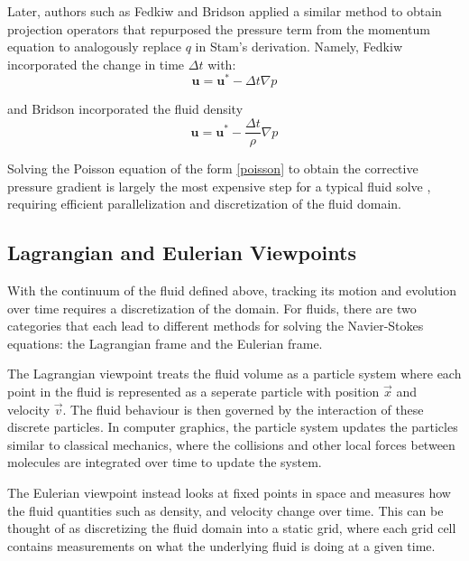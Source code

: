 \documentclass[a4paper, 11pt, titlepage]{article}
\begin{document}
Later, authors such as Fedkiw \cite{fedkiw2001visual} and Bridson \cite{bridsonbook} applied a
similar method to obtain projection operators that repurposed the pressure term
from the momentum equation to analogously replace $q$ in Stam's derivation. Namely, Fedkiw
incorporated the change in time $\Delta t$ with:
$$
    \bm{u} = \bm{u}^* - \Delta t \nabla p
$$

and Bridson incorporated the fluid density
$$
    \bm{u} = \bm{u}^* - \frac{\Delta t}{\rho} \nabla p
$$

Solving the Poisson equation of the form
\eqref{poisson} to obtain the corrective pressure gradient is largely the most
expensive step for a typical fluid solve \cite{bridsonbook}, requiring efficient
parallelization and discretization of the fluid domain.

\subsection{Lagrangian and Eulerian Viewpoints}
With the continuum of the fluid defined above, tracking its motion and evolution
over time requires a discretization of the domain. For fluids, there are two
categories that  each lead to different methods for solving
the Navier-Stokes equations: the Lagrangian frame and the Eulerian frame.

The Lagrangian viewpoint treats the fluid volume as a particle system where each
point in the fluid is represented as a seperate particle with position $\vec{x}$ and
velocity $\vec{v}$. The fluid behaviour is then governed by the interaction of
these discrete particles. In computer graphics, the particle system updates the
particles similar to classical mechanics, where the collisions and other local
forces between molecules are integrated over time to update the system.

The Eulerian viewpoint instead looks at fixed points in space and measures how the
fluid quantities such as density, and velocity change over time. This can be
thought of as discretizing the fluid domain into a static grid, where each grid cell
contains measurements on what the underlying fluid is doing at a given time.
\end{document}

